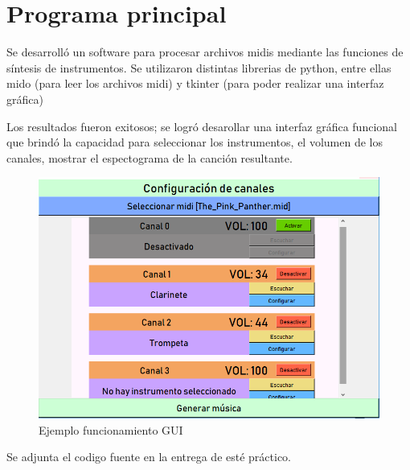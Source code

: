 \documentclass[assd_tp2_main.tex]{subfiles}
\begin{document}
\section{Programa principal}
Se desarrolló un software para procesar archivos midis mediante las funciones de síntesis de instrumentos. Se utilizaron distintas librerias de python, entre ellas mido (para leer los archivos midi) y tkinter (para poder realizar una interfaz gráfica)

Los resultados fueron exitosos; se logró desarollar una interfaz gráfica funcional que brindó la capacidad para seleccionar los instrumentos, el volumen de los canales, mostrar el espectograma de la canción resultante.


\begin{figure}[H]
\centering
\includegraphics[width=1\linewidth]{graficos/gui.png}
\caption{Ejemplo funcionamiento GUI}

\end{figure}

Se adjunta el codigo fuente en la entrega de esté práctico.
\end{document}
